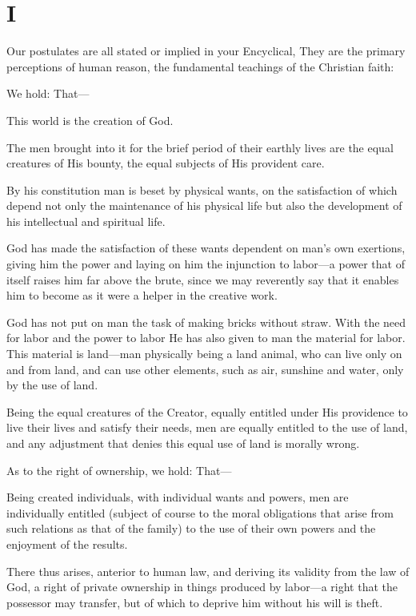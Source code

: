\documentclass{book}
\begin{document}
\chapter*{I}
\label{chapter-1}
Our postulates are all stated or implied in your Encyclical, They are the primary perceptions of human reason, the fundamental teachings of the Christian faith:

We hold: That—

This world is the creation of God.

The men brought into it for the brief period of their earthly lives are the equal creatures of His bounty, the equal subjects of His provident care.

By his constitution man is beset by physical wants, on the satisfaction of which depend not only the maintenance of his physical life but also the development of his intellectual and spiritual life.

God has made the satisfaction of these wants dependent on man’s own exertions, giving him the power and laying on him the injunction to labor—a power that of itself raises him far above the brute, since we may reverently say that it enables him to become as it were a helper in the creative work.

God has not put on man the task of making bricks without straw. With the need for labor and the power to labor He has also given to man the material for labor. This material is land—man physically being a land animal, who can live only on and from land, and can use other elements, such as air, sunshine and water, only by the use of land.

Being the equal creatures of the Creator, equally entitled under His providence to live their lives and satisfy their needs, men are equally entitled to the use of land, and any adjustment that denies this equal use of land is morally wrong.

As to the right of ownership, we hold: That—

Being created individuals, with individual wants and powers, men are individually entitled (subject of course to the moral obligations that arise from such relations as that of the family) to the use of their own powers and the enjoyment of the results.

There thus arises, anterior to human law, and deriving its validity from the law of God, a right of private ownership in things produced by labor—a right that the possessor may transfer, but of which to deprive him without his will is theft.
\end{document}
